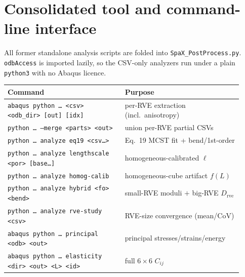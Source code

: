 \documentclass[11pt]{article}
\newcommand{\code}[1]{\texttt{\small #1}}
\begin{document}
\section{Consolidated tool and command-line interface}
\label{sec:cli}
All former standalone analysis scripts are folded into
\code{SpaX\_PostProcess.py}. \code{odbAccess} is imported lazily, so the
CSV-only analyzers run under a plain \code{python3} with no Abaqus licence.

\begin{center}
\begin{tabular}{@{}>{\raggedright\arraybackslash}p{0.46\linewidth} >{\raggedright\arraybackslash}p{0.46\linewidth}@{}}
\toprule
\textbf{Command} & \textbf{Purpose}\\
\midrule
\code{abaqus python \dots\ <csv> <odb\_dir> [out] [idx]} & per-RVE extraction (incl.\ anisotropy)\\
\code{python \dots\ --merge <parts> <out>} & union per-RVE partial CSVs\\
\code{python \dots\ analyze eq19 <csv\ldots>} & Eq.~19 MCST fit + bend/1st-order\\
\code{python \dots\ analyze lengthscale <por> [base\ldots]} & homogeneous-calibrated $\ell$\\
\code{python \dots\ analyze homog-calib} & homogeneous-cube artifact $f(L)$\\
\code{python \dots\ analyze hybrid <fo> <bend>} & small-RVE moduli $+$ big-RVE $D_\text{rve}$\\
\code{python \dots\ analyze rve-study <csv>} & RVE-size convergence (mean/CoV)\\
\code{abaqus python \dots\ principal <odb> <out>} & principal stresses/strains/energy\\
\code{abaqus python \dots\ elasticity <dir> <out> <L> <id>} & full $6\times6$ $C_{ij}$\\
\bottomrule
\end{tabular}
\end{center}

\end{document}
